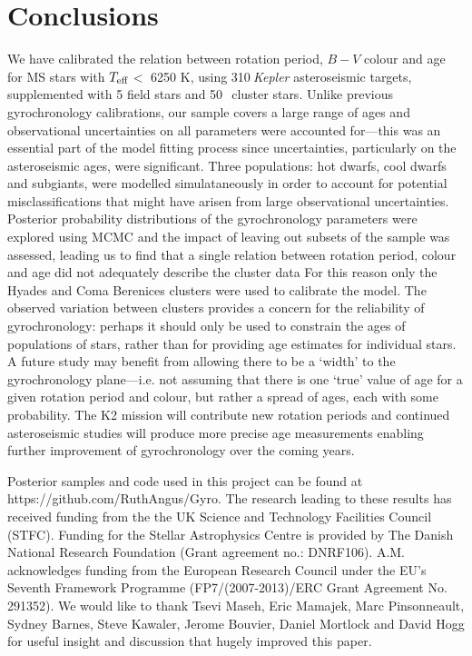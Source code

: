 \documentclass[11pt,preprint]{aastex}
\newcommand{\teff}{$T_{\rm{eff}}$}
\newcommand{\nastero}{310}
\newcommand{\nHC}{50~}
\begin{document}
\section{Conclusions}
\label{sec:conclusions}

We have calibrated the relation between rotation period, $B-V$ colour and age for MS stars with \teff$<$ 6250 K, using \nastero$~${\it Kepler} asteroseismic targets, supplemented with 5 field stars and \nHC$~$cluster stars.
Unlike previous gyrochronology calibrations, our sample covers a large range of ages and observational uncertainties on all parameters were accounted for---this was an essential part of the model fitting process since uncertainties, particularly on the asteroseismic ages, were significant.
Three populations: hot dwarfs, cool dwarfs and subgiants, were modelled simulataneously in order to account for potential misclassifications that might have arisen from large observational uncertainties.
Posterior probability distributions of the gyrochronology parameters were explored using MCMC and the impact of leaving out subsets of the sample was assessed, leading us to find that a single relation between rotation period, colour and age did not adequately describe the cluster data
For this reason only the Hyades and Coma Berenices clusters were used to calibrate the model.
The observed variation between clusters provides a concern for the reliability of gyrochronology: perhaps it should only be used to constrain the ages of populations of stars, rather than for providing age estimates for individual stars.
A future study may benefit from allowing there to be a `width' to the gyrochronology plane---i.e. not assuming that there is one `true' value of age for a given rotation period and colour, but rather a spread of ages, each with some probability.
The K2 mission will contribute new rotation periods and continued asteroseismic studies will produce more precise age measurements enabling further improvement of gyrochronology over the coming years.

Posterior samples and code used in this project can be found at https://github.com/RuthAngus/Gyro.
The research leading to these results has received funding from the the UK Science and Technology Facilities Council (STFC).
Funding for the Stellar Astrophysics Centre is provided by The Danish National Research Foundation (Grant agreement no.: DNRF106).
A.M. acknowledges funding from the European Research Council under the EU’s Seventh Framework Programme (FP7/(2007-2013)/ERC Grant Agreement No. 291352).
We would like to thank Tsevi Maseh, Eric Mamajek, Marc Pinsonneault, Sydney Barnes, Steve Kawaler, Jerome Bouvier, Daniel Mortlock and David Hogg for useful insight and discussion that hugely improved this paper.
\end{document}
